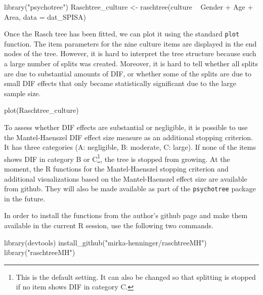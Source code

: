 \documentclass[doc,floatsintext,natbib]{apa7}
\begin{document}
\begin{Schunk}
\begin{Sinput}
 library("psychotree")
 Raschtree_culture <- raschtree(culture ~  Gender + Age + Area,
                                data = dat_SPISA)
\end{Sinput}
\end{Schunk}

Once the Rasch tree has been fitted, we can plot it using the standard \texttt{plot} function. The item parameters for the nine culture items are displayed in the end nodes of the tree. However, it is hard to interpret the tree structure because such a large number of splits was created. Moreover, it is hard to tell whether all splits are due to substantial amounts of DIF, or whether some of the splits are due to small DIF effects that only became statistically significant due to the large sample size.



\begin{Schunk}
\begin{Sinput}
 plot(Raschtree_culture)
\end{Sinput}
\end{Schunk}


To assess whether DIF effects are substantial or negligible, it is possible to use the Mantel-Haenszel DIF effect size measure as an additional stopping criterion. It has three categories (A: negligible, B: moderate, C: large). If none of the items shows DIF in category B or C\footnote{This is the default setting. It can also be changed so that splitting is stopped if no item shows DIF in category C.}, the tree is stopped from growing.
At the moment, the R functions for the Mantel-Haenszel stopping criterion and additional visualizations based on the Mantel-Haenszel effect size are available from github. They will also be made available as part of the \texttt{psychotree} package in the future.

In order to install the functions from the author's github page and make them available in the current R session, use the following two commands.

\begin{Schunk}
\begin{Sinput}
 library(devtools)
 install_github("mirka-henninger/raschtreeMH")
 library("raschtreeMH")
\end{Sinput}
\end{Schunk}
\end{document}
